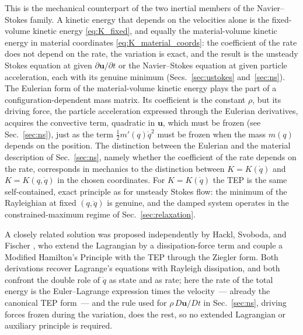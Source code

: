 \documentclass[aip,pof,reprint,amsmath,amssymb,longbibliography]{revtex4-2}
\begin{document}
This is the mechanical counterpart of the two inertial members of the Navier--Stokes family. A kinetic energy that depends on the velocities alone is the fixed-volume kinetic energy \eqref{eq:K_fixed}, and equally the material-volume kinetic energy in material coordinates \eqref{eq:K_material_coords}: the coefficient of the rate does not depend on the rate, the variation is exact, and the result is the unsteady Stokes equation at given $\partial\boldsymbol{u}/\partial t$ or the Navier--Stokes equation at given particle acceleration, each with its genuine minimum (Secs.~\ref{sec:ustokes} and~\ref{sec:ns}). The Eulerian form of the material-volume kinetic energy plays the part of a configuration-dependent mass matrix. Its coefficient is the constant $\rho$, but its driving force, the particle acceleration expressed through the Eulerian derivatives, acquires the convective term, quadratic in $\boldsymbol{u}$, which must be frozen (see Sec.~\ref{sec:ns}), just as the term $\tfrac{1}{2} m'(q)\dot{q}^2$ must be frozen when the mass $m(q)$ depends on the position. The distinction between the Eulerian and the material description of Sec.~\ref{sec:ns}, namely whether the coefficient of the rate depends on the rate, corresponds in mechanics to the distinction between $K = K(\dot{q})$ and $K = K(q, \dot{q})$ in the chosen coordinates. For $K = K(\dot{q})$ the TEP is the same self-contained, exact principle as for unsteady Stokes flow: the minimum of the Rayleighian at fixed $(q, \ddot{q})$ is genuine, and the damped system operates in the constrained-maximum regime of Sec.~\ref{sec:relaxation}.

A closely related solution was proposed independently by Hackl, Svoboda, and Fischer \cite{hackl2024coupling}, who extend the Lagrangian by a dissipation-force term and couple a Modified Hamilton's Principle with the TEP through the Ziegler form. Both derivations recover Lagrange's equations with Rayleigh dissipation, and both confront the double role of $\dot{q}$ as state and as rate; here the rate of the total energy is the Euler--Lagrange expression times the velocity~--- already the canonical TEP form~--- and the rule used for $\rho\, D\boldsymbol{u}/Dt$ in Sec.~\ref{sec:ns}, driving forces frozen during the variation, does the rest, so no extended Lagrangian or auxiliary principle is required.
\end{document}
